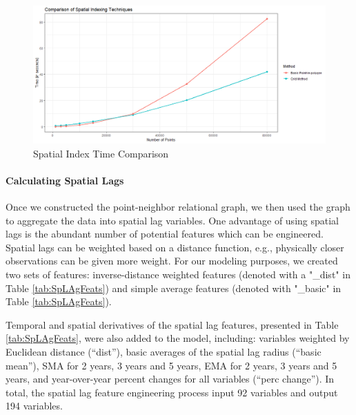 \documentclass[conference,final,]{IEEEtran}
\makeatletter
\def\maxwidth{\ifdim\Gin@nat@width>\linewidth\linewidth
\else\Gin@nat@width\fi}
\let\Oldincludegraphics\includegraphics
\renewcommand{\includegraphics}[1]{\Oldincludegraphics[width=\maxwidth]{#1}}
\makeatother
\begin{document}
\begin{figure}
\centering
\includegraphics{Sections/tables_and_figures/Example_Spatial_Indexing_Techniques.png}
\caption{\label{fig:Spatial Indexing Process}Spatial Index Time
Comparison}
\end{figure}

\hypertarget{calculating-spatial-lags}{%
\paragraph{Calculating Spatial Lags}\label{calculating-spatial-lags}}

Once we constructed the point-neighbor relational graph, we then used
the graph to aggregate the data into spatial lag variables. One
advantage of using spatial lags is the abundant number of potential
features which can be engineered. Spatial lags can be weighted based on
a distance function, e.g., physically closer observations can be given
more weight. For our modeling purposes, we created two sets of features:
inverse-distance weighted features (denoted with a "\_dist" in Table
\ref{tab:SpLAgFeats}) and simple average features (denoted with
"\_basic" in Table \ref{tab:SpLAgFeats}).

Temporal and spatial derivatives of the spatial lag features, presented
in Table \ref{tab:SpLAgFeats}, were also added to the model, including:
variables weighted by Euclidean distance (``dist''), basic averages of
the spatial lag radius (``basic mean''), SMA for 2 years, 3 years and 5
years, EMA for 2 years, 3 years and 5 years, and year-over-year percent
changes for all variables (``perc change''). In total, the spatial lag
feature engineering process input 92 variables and output 194 variables.
\end{document}
